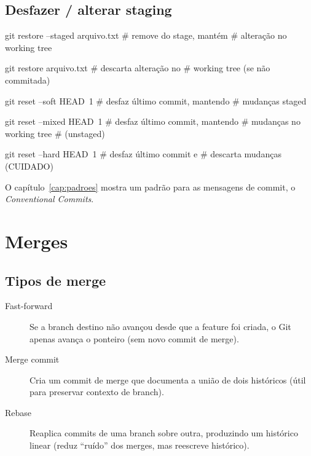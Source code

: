 \subsection{Desfazer / alterar staging}
\begin{bashcode}
git restore --staged arquivo.txt   # remove do stage, mantém
                                   # alteração no working tree

git restore arquivo.txt            # descarta alteração no
                                   # working tree (se não commitada)

git reset --soft HEAD~1            # desfaz último commit, mantendo
                                   # mudanças staged

git reset --mixed HEAD~1           # desfaz último commit, mantendo
                                   # mudanças no working tree
                                   # (unstaged)

git reset --hard HEAD~1            # desfaz último commit e 
                                   # descarta mudanças (CUIDADO)
\end{bashcode}

\begin{dica}
O capítulo~\ref{cap:padroes} mostra um padrão para as mensagens de commit, o \emph{Conventional Commits}.
\end{dica}

\section{Merges}

\subsection{Tipos de merge}
\begin{description}
  \item[Fast-forward] Se a branch destino não avançou desde que a feature foi criada, o Git apenas avança o ponteiro (sem novo commit de merge).
  \item[Merge commit] Cria um commit de merge que documenta a união de dois históricos (útil para preservar contexto de branch).
  \item[Rebase] Reaplica commits de uma branch sobre outra, produzindo um histórico linear (reduz ``ruído'' dos merges, mas reescreve histórico).
\end{description}


